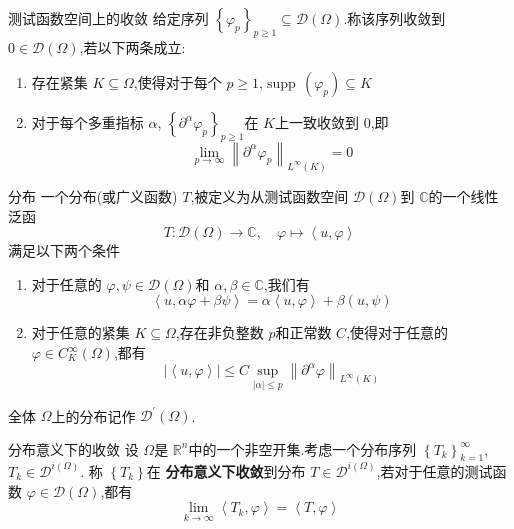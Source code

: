 \documentclass[../../main.tex]{subfiles}
\begin{document}
\begin{definition}{测试函数空间上的收敛}
    给定序列 \(  \left\{  \varphi _{p} \right\}_{p\ge 1}\subseteq \mathcal{D}\left(  \Omega  \right)  \).称该序列收敛到 \(  0 \in \mathcal{D}\left(  \Omega  \right)   \),若以下两条成立:
    \begin{enumerate}
        \item 存在紧集 \(  K\subseteq  \Omega   \),使得对于每个 \(  p\ge 1  \),\(  \operatorname{supp}\,\left(  \varphi _{p} \right)\subseteq K   \)
        \item 对于每个多重指标 \(  \alpha   \), \(  \left\{ \partial ^{\alpha } \varphi _{p} \right\}_{p\ge 1}  \)在 \(  K  \)上一致收敛到 \(  0  \),即 \[
        \lim_{p\to \infty} \left\|  \partial ^{\alpha } \varphi _{p} \right\|_{L^{\infty}\left( K \right) }= 0
        \]       
    \end{enumerate}
      
\end{definition}
\begin{definition}{分布}
     一个分布(或广义函数) \(  T  \),被定义为从测试函数空间 \(  \mathcal{D}\left(  \Omega  \right)   \)到 \(  \mathbb{C}   \)的一个线性泛函 \[
    T: \mathcal{D}\left(  \Omega  \right)\to \mathbb{C}  ,\quad  \varphi \mapsto \left<u, \varphi  \right>
    \]
   满足以下两个条件\begin{enumerate}
    \item 对于任意的 \(   \varphi ,\psi  \in \mathcal{D}\left(  \Omega  \right)   \)和 \(  \alpha ,\beta \in \mathbb{C}   \),我们有 \[
    \left<u,\alpha  \varphi + \beta \psi  \right>= \alpha \left<u, \varphi  \right>+ \beta \left( u,\psi  \right) 
    \]  
    \item 对于任意的紧集 \(  K\subseteq  \Omega   \),存在非负整数 \(  p  \)和正常数 \(  C  \),使得对于任意的 \(   \varphi \in C_{K}^{\infty}\left(  \Omega  \right)   \),都有 \[
    \left| \left<u, \varphi  \right> \right|\le C \sup _{\left| \alpha  \right|\le p }\left\|  \partial ^{\alpha } \varphi  \right\|_{L^{\infty}\left( K \right) } 
    \]    
    
   \end{enumerate}
   

   全体 \(   \Omega   \)上的分布记作 \(  \mathcal{D}^{\prime} \left(  \Omega  \right)   \).  
\end{definition}

\begin{definition}{分布意义下的收敛}
    设 \(   \Omega   \)是 \(  \mathbb{R} ^{n}  \)中的一个非空开集.考虑一个分布序列 \(  \left\{ T_{k} \right\}_{k= 1}^{\infty}  \), \(  T_{k}\in \mathcal{D}^{i\left(  \Omega  \right) }  \). 称 \(  \left\{ T_{k} \right\}  \)在 \textbf{分布意义下收敛}到分布 \(  T\in \mathcal{D}^{i\left(  \Omega  \right) }  \),若对于任意的测试函数 \(   \varphi \in \mathcal{D}\left(  \Omega  \right)   \),都有 \[
    \lim_{k\to \infty}\left<T_{k},\varphi  \right>= \left<T, \varphi  \right>
    \]       
\end{definition}
\end{document}
